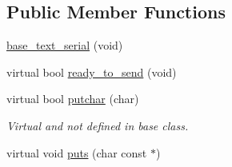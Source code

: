 \subsection*{Public Member Functions}
\begin{DoxyCompactItemize}
\item 
\hyperlink{classbase__text__serial_a621b070a779b138b2dab34b3e33616fe}{base\-\_\-text\-\_\-serial} (void)
\item 
virtual bool \hyperlink{classbase__text__serial_ac20fa8adfde943956f8750c4e662627c}{ready\-\_\-to\-\_\-send} (void)
\item 
\hypertarget{classbase__text__serial_a945e2929f72e578d3c4d3f5de8087567}{virtual bool \hyperlink{classbase__text__serial_a945e2929f72e578d3c4d3f5de8087567}{putchar} (char)}\label{classbase__text__serial_a945e2929f72e578d3c4d3f5de8087567}

\begin{DoxyCompactList}\small\item\em Virtual and not defined in base class. \end{DoxyCompactList}\item 
\hypertarget{classbase__text__serial_a1699dd6cb65575604f66abbf762a2131}{virtual void \hyperlink{classbase__text__serial_a1699dd6cb65575604f66abbf762a2131}{puts} (char const $\ast$)}\label{classbase__text__serial_a1699dd6cb65575604f66abbf762a2131}


\end{DoxyCompactItemize}
